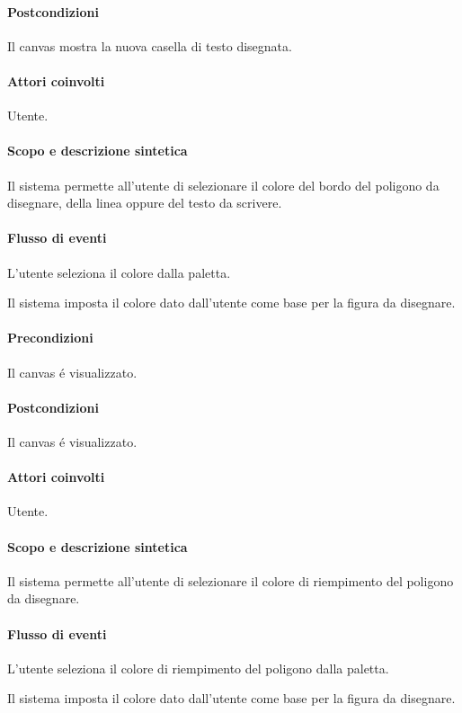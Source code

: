 \paragraph{Postcondizioni} Il canvas mostra la nuova casella di testo disegnata.

\paragraph{Attori coinvolti} Utente.
\paragraph{Scopo e descrizione sintetica} 
Il sistema permette all'utente di selezionare il colore del bordo del poligono da disegnare, della linea oppure del testo da scrivere.
\paragraph{Flusso di eventi}
\begin{elenconumerato}[\textbf{}]{\subsubsecindent}
\item L'utente seleziona il colore dalla paletta.
\item Il sistema imposta il colore dato dall'utente come base per la figura da disegnare.
\end{elenconumerato}
\paragraph{Precondizioni} Il canvas \'e visualizzato.
\paragraph{Postcondizioni} Il canvas \'e visualizzato.

\paragraph{Attori coinvolti} Utente.
\paragraph{Scopo e descrizione sintetica} 
Il sistema permette all'utente di selezionare il colore di riempimento del poligono da disegnare.
\paragraph{Flusso di eventi}
\begin{elenconumerato}[\textbf{}]{\subsubsecindent}
\item L'utente seleziona il colore di riempimento del poligono dalla paletta.
\item Il sistema imposta il colore dato dall'utente come base per la figura da disegnare.
\end{elenconumerato}
